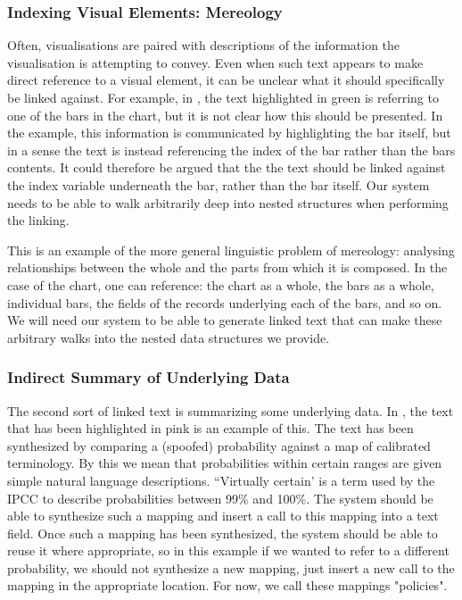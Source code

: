 \subsubsection{Indexing Visual Elements: Mereology}
Often, visualisations are paired with descriptions of the information the visualisation is attempting to
convey. Even when such text appears to make direct reference to a visual element, it can be unclear what 
it should specifically be linked against. For example, in , the text highlighted
in green is referring to one of the bars in the chart, but it is not clear how this should be presented.
In the example, this information is communicated by highlighting the bar itself, but in a sense the text is
instead referencing the index of the bar rather than the bars contents. It could therefore be argued that the
the text should be linked against the index variable underneath the bar, rather than the bar itself.
Our system needs to be able to walk arbitrarily deep into nested structures when performing the linking.

This is an example of the more general linguistic problem of mereology: analysing relationships between the
whole and the parts from which it is composed. In the case of the chart, one can reference: the chart as a whole,
the bars as a whole, individual bars, the fields of the records underlying each of the bars, and so on.
We will need our system to be able to generate linked text that can make these arbitrary walks into the nested
data structures we provide.


\subsubsection{Indirect Summary of Underlying Data}
The second sort of linked text is summarizing some underlying data. In ,
the text that has been highlighted in pink is an example of this. The text has been synthesized
by comparing a (spoofed) probability against a map of calibrated terminology. By this we mean that
probabilities within certain ranges are given simple natural language descriptions. ``Virtually certain'
is a term used by the IPCC to describe probabilities between 99\% and 100\%. The system should be able
to synthesize such a mapping and insert a call to this mapping into a text field. Once such a mapping
has been synthesized, the system should be able to reuse it where appropriate, so in this example if
we wanted to refer to a different probability, we should not synthesize a new mapping, just insert
a new call to the mapping in the appropriate location. For now, we call these mappings "policies".

